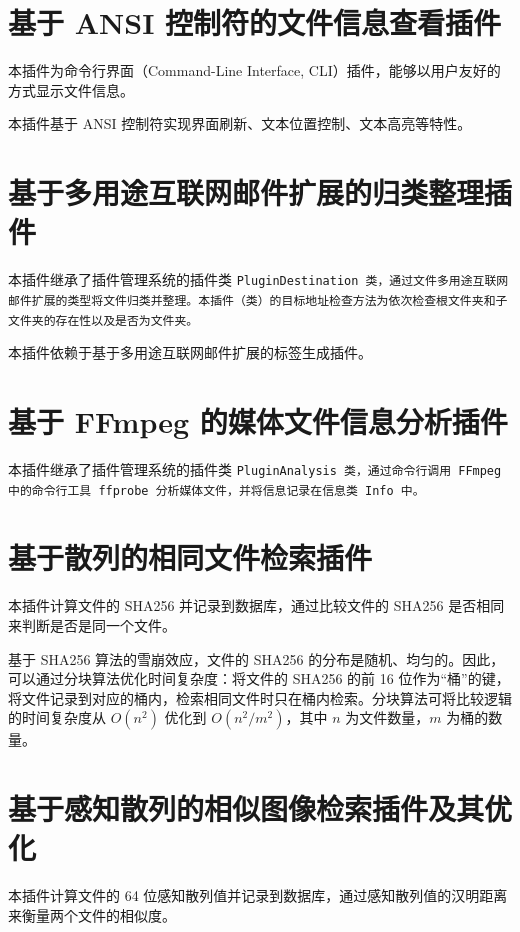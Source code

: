 \section{基于 ANSI 控制符的文件信息查看插件}

本插件为命令行界面（Command-Line Interface, CLI）插件，能够以用户友好的方式显示文件信息。

本插件基于 ANSI 控制符实现界面刷新、文本位置控制、文本高亮等特性。

\section{基于多用途互联网邮件扩展的归类整理插件}

本插件继承了插件管理系统的插件类 \tt{PluginDestination} 类，通过文件多用途互联网邮件扩展的类型将文件归类并整理。本插件（类）的目标地址检查方法为依次检查根文件夹和子文件夹的存在性以及是否为文件夹。

本插件依赖于基于多用途互联网邮件扩展的标签生成插件。

\section{基于 FFmpeg 的媒体文件信息分析插件}

本插件继承了插件管理系统的插件类 \tt{PluginAnalysis} 类，通过命令行调用 FFmpeg 中的命令行工具 ffprobe 分析媒体文件，并将信息记录在信息类 \tt{Info} 中。

\section{基于散列的相同文件检索插件}

本插件计算文件的 SHA256 并记录到数据库，通过比较文件的 SHA256 是否相同来判断是否是同一个文件。

基于 SHA256 算法的雪崩效应，文件的 SHA256 的分布是随机、均匀的。因此，可以通过分块算法优化时间复杂度：将文件的 SHA256 的前 16 位作为“桶”的键，将文件记录到对应的桶内，检索相同文件时只在桶内检索。分块算法可将比较逻辑的时间复杂度从 $O(n^2)$ 优化到 $O(n^2/m^2)$，其中 $n$ 为文件数量，$m$ 为桶的数量。

\section{基于感知散列的相似图像检索插件及其优化}

本插件计算文件的 64 位感知散列值并记录到数据库，通过感知散列值的汉明距离来衡量两个文件的相似度。

